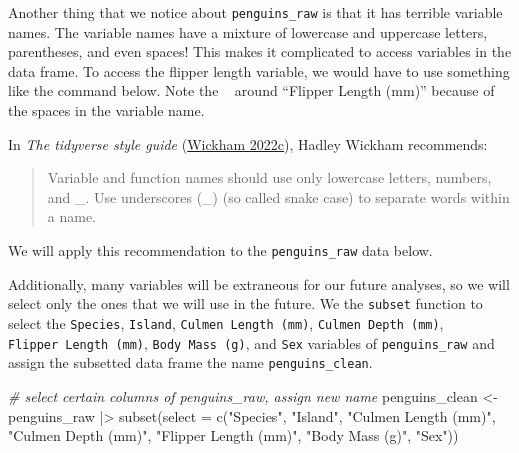 \documentclass[
]{book}
\newenvironment{Shaded}{\begin{snugshade}}{\end{snugshade}}
\newcommand{\AttributeTok}[1]{\textcolor[rgb]{0.77,0.63,0.00}{#1}}
\newcommand{\CommentTok}[1]{\textcolor[rgb]{0.56,0.35,0.01}{\textit{#1}}}
\newcommand{\DocumentationTok}[1]{\textcolor[rgb]{0.56,0.35,0.01}{\textbf{\textit{#1}}}}
\newcommand{\FunctionTok}[1]{\textcolor[rgb]{0.00,0.00,0.00}{#1}}
\newcommand{\NormalTok}[1]{#1}
\newcommand{\OtherTok}[1]{\textcolor[rgb]{0.56,0.35,0.01}{#1}}
\newcommand{\SpecialCharTok}[1]{\textcolor[rgb]{0.00,0.00,0.00}{#1}}
\newcommand{\StringTok}[1]{\textcolor[rgb]{0.31,0.60,0.02}{#1}}
\theoremstyle{definition}
\theoremstyle{definition}
\theoremstyle{definition}
\theoremstyle{definition}
\theoremstyle{remark}
\begin{document}
Another thing that we notice about \texttt{penguins\_raw} is that it has terrible variable names. The variable names have a mixture of lowercase and uppercase letters, parentheses, and even spaces! This makes it complicated to access variables in the data frame. To access the flipper length variable, we would have to use something like the command below. Note the \texttt{\textasciigrave{}\ \textasciigrave{}} around ``Flipper Length (mm)'' because of the spaces in the variable name.

\begin{Shaded}
\end{Shaded}

In \emph{The tidyverse style guide} (\protect\hyperlink{ref-tidyversestyleguide}{Wickham 2022c}), Hadley Wickham recommends:

\begin{quote}
Variable and function names should use only lowercase letters, numbers, and \_. Use underscores (\_) (so called snake case) to separate words within a name.
\end{quote}

We will apply this recommendation to the \texttt{penguins\_raw} data below.

Additionally, many variables will be extraneous for our future analyses, so we will select only the ones that we will use in the future. We the \texttt{subset} function to select the \texttt{Species}, \texttt{Island}, \texttt{Culmen\ Length\ (mm)}, \texttt{Culmen\ Depth\ (mm)}, \texttt{Flipper\ Length\ (mm)}, \texttt{Body\ Mass\ (g)}, and \texttt{Sex} variables of \texttt{penguins\_raw} and assign the subsetted data frame the name \texttt{penguins\_clean}.

\begin{Shaded}
\begin{Highlighting}[]
\CommentTok{\# select certain columns of penguins\_raw, assign new name}
\NormalTok{penguins\_clean }\OtherTok{\textless{}{-}}
\NormalTok{  penguins\_raw }\SpecialCharTok{|\textgreater{}}
  \FunctionTok{subset}\NormalTok{(}\AttributeTok{select =} \FunctionTok{c}\NormalTok{(}\StringTok{"Species"}\NormalTok{, }\StringTok{"Island"}\NormalTok{, }\StringTok{"Culmen Length (mm)"}\NormalTok{, }\StringTok{"Culmen Depth (mm)"}\NormalTok{, }\StringTok{"Flipper Length (mm)"}\NormalTok{, }\StringTok{"Body Mass (g)"}\NormalTok{, }\StringTok{"Sex"}\NormalTok{))}
\end{Highlighting}
\end{Shaded}
\end{document}
